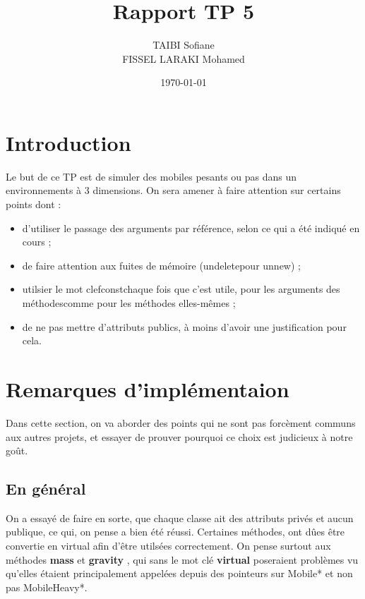 \documentclass{article}
\title{Rapport TP 5}
\author{TAIBI Sofiane \\ FISSEL LARAKI Mohamed}
\date{\today}
\begin{document}
\maketitle
\vspace{2cm}
\tableofcontents\newpage


\section*{Introduction}
Le but de ce TP est de simuler des mobiles pesants ou pas dans un
environnements à 3 dimensions. On sera amener à faire attention sur certains
points dont :
\begin{itemize}
\item  d’utiliser le passage des arguments par référence, selon ce qui a été indiqué en cours ;
\item  de faire attention aux fuites de mémoire (undeletepour unnew) ;
\item  utilsier le mot clefconstchaque fois que c’est utile, pour les arguments des méthodescomme pour les méthodes elles-mêmes ;
\item  de ne pas mettre d’attributs publics, à moins d’avoir une justification pour cela.
\end{itemize}

\vspace{3cm}
\section{Remarques d'implémentaion}
    Dans cette section, on va aborder des points qui ne sont pas forcèment
    communs aux autres projets, et essayer de prouver pourquoi ce choix est
    judicieux à notre goût.
    \subsection{En général }
        On a essayé de faire en sorte, que chaque classe ait des attributs
        privés et aucun publique, ce qui, on pense a bien été réussi. Certaines
        méthodes, ont dûes être convertie en virtual afin d'être utilsées
        correctement. On pense surtout aux méthodes \textbf{mass} et
        \textbf{gravity} , qui sans le mot clé \textbf{virtual} poseraient
        problèmes vu qu'elles étaient principalement appelées depuis des
        pointeurs sur Mobile* et non pas MobileHeavy*.
\end{document}
